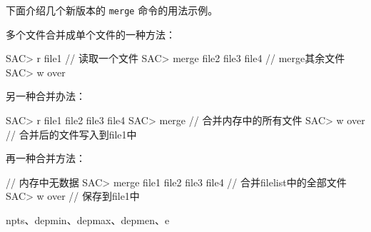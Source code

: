 下面介绍几个新版本的 \texttt{merge} 命令的用法示例。

多个文件合并成单个文件的一种方法：
\begin{SACCode}
SAC> r file1                        // 读取一个文件
SAC> merge file2 file3 file4        // merge其余文件
SAC> w over
\end{SACCode}

另一种合并办法：
\begin{SACCode}
SAC> r file1 file2 file3 file4
SAC> merge                      // 合并内存中的所有文件
SAC> w over                     // 合并后的文件写入到file1中
\end{SACCode}

再一种合并方法：
\begin{SACCode}                     
                                    // 内存中无数据
SAC> merge file1 file2 file3 file4  // 合并filelist中的全部文件
SAC> w over                         // 保存到file1中
\end{SACCode}

npts、depmin、depmax、depmen、e
